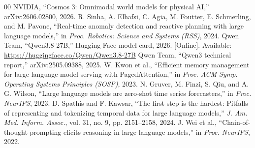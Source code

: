 \documentclass[conference]{IEEEtran}
\begin{document}
\begin{thebibliography}{00}
 NVIDIA, ``Cosmos 3: Omnimodal world models for physical AI,'' arXiv:2606.02800, 2026.
 R. Sinha, A. Elhafsi, C. Agia, M. Foutter, E. Schmerling, and M. Pavone, ``Real-time anomaly detection and reactive planning with large language models,'' in \emph{Proc. Robotics: Science and Systems (RSS)}, 2024.
 Qwen Team, ``Qwen3.8-27B,'' Hugging Face model card, 2026. [Online]. Available: \url{https://huggingface.co/Qwen/Qwen3.8-27B}
 Qwen Team, ``Qwen3 technical report,'' arXiv:2505.09388, 2025.
 W. Kwon et al., ``Efficient memory management for large language model serving with PagedAttention,'' in \emph{Proc. ACM Symp. Operating Systems Principles (SOSP)}, 2023.
 N. Gruver, M. Finzi, S. Qiu, and A. G. Wilson, ``Large language models are zero-shot time series forecasters,'' in \emph{Proc. NeurIPS}, 2023.
 D. Spathis and F. Kawsar, ``The first step is the hardest: Pitfalls of representing and tokenizing temporal data for large language models,'' \emph{J. Am. Med. Inform. Assoc.}, vol. 31, no. 9, pp. 2151--2158, 2024.
 J. Wei et al., ``Chain-of-thought prompting elicits reasoning in large language models,'' in \emph{Proc. NeurIPS}, 2022.
\end{thebibliography}
\end{document}
